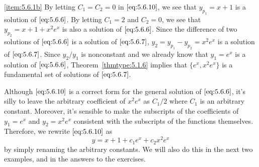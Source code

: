 \documentclass{ximera}
\begin{document}
\begin{example}
\begin{explanation}
\ref{item:5.6.1b} By letting $C_1=C_2=0$ in $\eqref{eq:5.6.10}$, we see that
$y_{p_1}=x+1$ is a solution of $\eqref{eq:5.6.6}$. By letting $C_1=2$ and
$C_2=0$, we see that $y_{p_2}=x+1+x^2e^x$ is also a solution of
$\eqref{eq:5.6.6}$. Since the difference of two solutions of $\eqref{eq:5.6.6}$ is
a solution of $\eqref{eq:5.6.7}$,
$y_2=y_{p_1}-y_{p_2}=x^2e^x$ is a solution of $\eqref{eq:5.6.7}$. Since
$y_2/y_1$ is nonconstant and we already know that $y_1=e^x$ is a
solution of $\eqref{eq:5.6.6}$, Theorem~\ref{thmtype:5.1.6} implies that
$\{e^x,x^2e^x\}$ is a fundamental set of solutions of
$\eqref{eq:5.6.7}$.
\end{explanation}
\end{example}
 
Although $\eqref{eq:5.6.10}$ is a correct form for the general solution of
$\eqref{eq:5.6.6}$, it's silly to leave the arbitrary coefficient of
$x^2e^x$ as $C_1/2$ where $C_1$ is an arbitrary constant. Moreover, it's
sensible to make the subscripts of the coefficients of $y_1=e^x$ and
$y_2=x^2e^x$ consistent with the subscripts of the functions
themselves. Therefore, we rewrite $\eqref{eq:5.6.10}$ as $$
y=x+1+c_1e^x+c_2x^2e^x $$ by simply renaming the arbitrary constants.
We will also do this in the next two examples, and in the answers to
the exercises.
 
\end{document}
